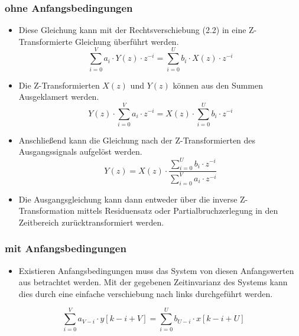 \documentclass[11pt]{article}
\providecommand{\tightlist}{%
      \setlength{\itemsep}{0pt}\setlength{\parskip}{0pt}}
\begin{document}
    \subsubsection{ohne Anfangsbedingungen}\label{ohne-anfangsbedingungen}

\begin{itemize}
\tightlist
\item
  Diese Gleichung kann mit der Rechtsverschiebung (2.2) in eine
  Z-Transformierte Gleichung überführt werden.
  \[\sum_{i=0}^V a_i \cdot Y(z) \cdot z^{-i} = \sum_{i=0}^U b_i \cdot X(z) \cdot z^{-i}\]
\end{itemize}

    \begin{itemize}
\tightlist
\item
  Die Z-Transformierten \(X(z)\) und \(Y(z)\) können aus den Summen
  Ausgeklamert werden.
  \[Y(z) \cdot \sum_{i=0}^V a_i \cdot z^{-i} = X(z) \cdot \sum_{i=0}^U b_i \cdot z^{-i}\]
\end{itemize}

    \begin{itemize}
\tightlist
\item
  Anschließend kann die Gleichung nach der Z-Transformierten des
  Ausgangssignals aufgelöst werden.
  \[Y(z) = X(z) \cdot \frac{\sum_{i=0}^U b_i \cdot z^{-i}}{\sum_{i=0}^V a_i \cdot z^{-i}}\]
\end{itemize}

    \begin{itemize}
\tightlist
\item
  Die Ausgangsgleichung kann dann entweder über die inverse
  Z-Transformation mittels Residuensatz oder Partialbruchzerlegung in
  den Zeitbereich zurücktransformiert werden.
\end{itemize}

    \subsubsection{mit Anfangsbedingungen}\label{mit-anfangsbedingungen}

\begin{itemize}
\tightlist
\item
  Existieren Anfangsbedingungen muss das System von diesen Anfangswerten
  aus betrachtet werden. Mit der gegebenen Zeitinvarianz des Systems
  kann dies durch eine einfache verschiebung nach links durchgeführt
  werden.
\end{itemize}

    \[\sum_{i = 0}^V a_{V-i} \cdot y[k-i+V] = \sum_{i = 0}^U b_{U-i} \cdot x[k-i+U]\]
\end{document}
